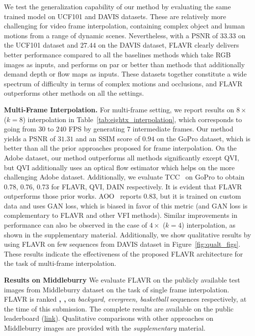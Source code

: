 \documentclass[10pt,twocolumn,letterpaper]{article}
\newcommand{\figref}[1]{Figure~\ref{#1}}
\newcommand{\tabref}[1]{Table~\ref{#1}}
\newcommand{\red}[1]{{#1}}
\newcommand{\Ours}{FLAVR}
\newcommand{\fourx}{$4\times$}
\newcommand{\eightx}{$8\times$}
\begin{document}
We test the generalization capability of our method by evaluating the same trained model on UCF101 and DAVIS datasets. These are relatively more challenging for video frame interpolation, containing complex object and human motions from a range of dynamic scenes. Nevertheless, with a PSNR of $33.33$ on the UCF101 dataset and $27.44$ on the DAVIS dataset, \Ours{} clearly delivers better performance compared to all the baselines methods which take RGB images as inputs, and performs on par or better than methods that additionally demand depth or flow maps as inputs. These datasets together constitute a wide spectrum of difficulty in terms of complex motions and occlusions, and \Ours{} outperforms other methods on all the settings. 

{\bf Multi-Frame Interpolation.} 
For multi-frame setting, we report results on \eightx{} ($k{=}8$) interpolation in \tabref{tab:eightx_interpolation}, which corresponds to going from $30$ to $240$ FPS by generating $7$ intermediate frames. Our method yields a PSNR of $31.31$ and an SSIM score of $0.94$ on the GoPro dataset, which is better than all the prior approaches proposed for frame interpolation. On the Adobe dataset, our method outperforms all methods significantly except QVI, but QVI additionally uses an optical flow estimator which helps on the more challenging Adobe dataset. Additionally, we evaluate TCC~\cite{chi2020all} on GoPro to obtain {0.78, 0.76, 0.73} for {FLAVR, QVI, DAIN} respectively. It is evident that FLAVR outperforms those prior works. AOO~\cite{chi2020all} reports 0.83, but it is trained on custom data and uses GAN loss, which is biased in favor of this metric (and GAN loss is complementary to FLAVR and other VFI methods).
Similar improvements in performance can also be observed in the case of \fourx{} ($k{=}4$) interpolation, as shown in the \red{supplementary material}. Additionally, we show qualitative results by using \Ours{} on few sequences from DAVIS dataset in \figref{fig:qualt_figs}. 
These results indicate the effectiveness of the proposed \Ours{} architecture for the task of multi-frame interpolation.

\red{ {\bf Results on Middleburry} We evaluate FLAVR on the publicly available test images from Middleburry \cite{baker2011database,scharstein2014high} dataset on the task of single frame interpolation. \Ours{} is ranked {\bf \nth{2}, \nth{5}, \nth{8}} on {\em backyard, evergreen, basketball} sequences respectively, at the time of this submission. The complete results are available on the public leaderboard (\href{https://vision.middlebury.edu/flow/eval/results/results-i1.php}{link}). 
Qualitative comparisons with other approaches on Middleburry images are provided with the \emph{supplementary} material.}
\end{document}
